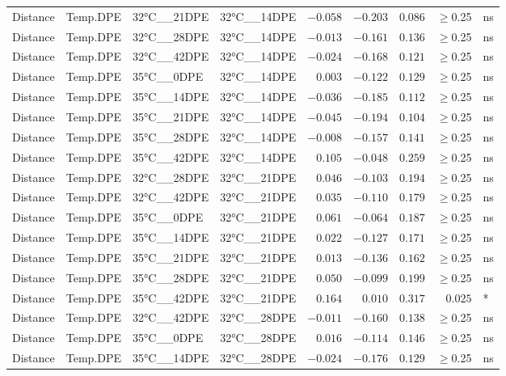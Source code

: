 \documentclass[
]{article}
\begin{document}
\begin{longtable}{llllrrrrl}
Distance & Temp.DPE & 32°C\_\_21DPE & 32°C\_\_14DPE & $-0.058$ & $-0.203$ & $0.086$ & $\geq$0.25 & ns \\ 
Distance & Temp.DPE & 32°C\_\_28DPE & 32°C\_\_14DPE & $-0.013$ & $-0.161$ & $0.136$ & $\geq$0.25 & ns \\ 
Distance & Temp.DPE & 32°C\_\_42DPE & 32°C\_\_14DPE & $-0.024$ & $-0.168$ & $0.121$ & $\geq$0.25 & ns \\ 
Distance & Temp.DPE & 35°C\_\_0DPE & 32°C\_\_14DPE & $0.003$ & $-0.122$ & $0.129$ & $\geq$0.25 & ns \\ 
Distance & Temp.DPE & 35°C\_\_14DPE & 32°C\_\_14DPE & $-0.036$ & $-0.185$ & $0.112$ & $\geq$0.25 & ns \\ 
Distance & Temp.DPE & 35°C\_\_21DPE & 32°C\_\_14DPE & $-0.045$ & $-0.194$ & $0.104$ & $\geq$0.25 & ns \\ 
Distance & Temp.DPE & 35°C\_\_28DPE & 32°C\_\_14DPE & $-0.008$ & $-0.157$ & $0.141$ & $\geq$0.25 & ns \\ 
Distance & Temp.DPE & 35°C\_\_42DPE & 32°C\_\_14DPE & $0.105$ & $-0.048$ & $0.259$ & $\geq$0.25 & ns \\ 
Distance & Temp.DPE & 32°C\_\_28DPE & 32°C\_\_21DPE & $0.046$ & $-0.103$ & $0.194$ & $\geq$0.25 & ns \\ 
Distance & Temp.DPE & 32°C\_\_42DPE & 32°C\_\_21DPE & $0.035$ & $-0.110$ & $0.179$ & $\geq$0.25 & ns \\ 
Distance & Temp.DPE & 35°C\_\_0DPE & 32°C\_\_21DPE & $0.061$ & $-0.064$ & $0.187$ & $\geq$0.25 & ns \\ 
Distance & Temp.DPE & 35°C\_\_14DPE & 32°C\_\_21DPE & $0.022$ & $-0.127$ & $0.171$ & $\geq$0.25 & ns \\ 
Distance & Temp.DPE & 35°C\_\_21DPE & 32°C\_\_21DPE & $0.013$ & $-0.136$ & $0.162$ & $\geq$0.25 & ns \\ 
Distance & Temp.DPE & 35°C\_\_28DPE & 32°C\_\_21DPE & $0.050$ & $-0.099$ & $0.199$ & $\geq$0.25 & ns \\ 
Distance & Temp.DPE & 35°C\_\_42DPE & 32°C\_\_21DPE & $0.164$ & $0.010$ & $0.317$ & $0.025$ & * \\ 
Distance & Temp.DPE & 32°C\_\_42DPE & 32°C\_\_28DPE & $-0.011$ & $-0.160$ & $0.138$ & $\geq$0.25 & ns \\ 
Distance & Temp.DPE & 35°C\_\_0DPE & 32°C\_\_28DPE & $0.016$ & $-0.114$ & $0.146$ & $\geq$0.25 & ns \\ 
Distance & Temp.DPE & 35°C\_\_14DPE & 32°C\_\_28DPE & $-0.024$ & $-0.176$ & $0.129$ & $\geq$0.25 & ns \\ 

\end{longtable}
\end{document}
